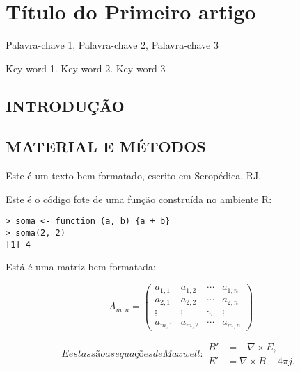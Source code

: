 \artigotrue
\chapter{Título do Primeiro artigo}
\label{chap:chapter01}

\begin{chapterabstractPOR}{Palavra-chave 1, Palavra-chave 2, Palavra-chave 3}
\end{chapterabstractPOR}

\begin{chapterabstractENG}{Key-word 1. Key-word 2. Key-word 3}
\end{chapterabstractENG}

\section{INTRODUÇÃO}

\blindtext[2]

\section{MATERIAL E MÉTODOS}

Este é um texto bem formatado, escrito em Seropédica, RJ. \blindtext[1]

Este é o código fote de uma função construída no ambiente R:

\begin{verbatim}
> soma <- function (a, b) {a + b}
> soma(2, 2)
[1] 4
\end{verbatim}

Está é uma matriz bem formatada:

\begin{equation}
  A_{m,n} =
 \begin{pmatrix}
  a_{1,1} & a_{1,2} & \cdots & a_{1,n} \\
  a_{2,1} & a_{2,2} & \cdots & a_{2,n} \\
  \vdots  & \vdots  & \ddots & \vdots  \\
  a_{m,1} & a_{m,2} & \cdots & a_{m,n}
 \end{pmatrix}
\end{equation}

\begin{subequations}\label{eq:maxwell}
E estas são as equações de Maxwell:
\begin{align}
        B'&=-\nabla \times E,\\
        E'&=\nabla \times B - 4\pi j,
\end{align}
\end{subequations}

